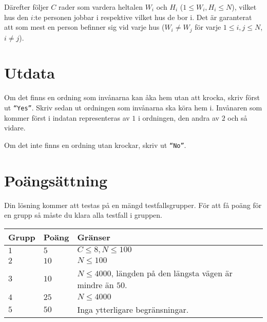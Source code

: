 Därefter följer $C$ rader som vardera heltalen $W_i$ och $H_i$ ($1 \leq W_i,H_i \leq N$), vilket hus
den $i$:te personen jobbar i respektive vilket hus de bor i. Det är garanterat att som mest en person befinner sig vid varje hus ($W_i \neq W_j$ för varje $1 \leq i,j \leq N$, $i \neq j$).

\section*{Utdata}
Om det finns en ordning som invånarna kan åka hem utan att krocka, skriv först ut \texttt{``Yes''}. 
Skriv sedan ut ordningen som invånarna ska köra hem i. Invånaren som kommer först i indatan representeras
av $1$ i ordningen, den andra av $2$ och så vidare.

Om det inte finns en ordning utan krockar, skriv ut \texttt{``No''}.

\section*{Poängsättning}
Din lösning kommer att testas på en mängd testfallsgrupper.
För att få poäng för en grupp så måste du klara alla testfall i gruppen.

\noindent
\begin{tabular}{| l | l | p{12cm} |}
  \hline
  \textbf{Grupp} & \textbf{Poäng} & \textbf{Gränser} \\ \hline
  $1$    & $5$        & $C \leq 8, N \leq 100$ \\ \hline
  $2$    & $10$       & $N \leq 100$ \\ \hline
  $3$    & $10$       & $N \leq 4000$, längden på den längsta vägen är mindre än $50$. \\ \hline
  $4$    & $25$       & $N \leq 4000$ \\ \hline
  $5$    & $50$       & Inga ytterligare begränsningar. \\ \hline
\end{tabular}


